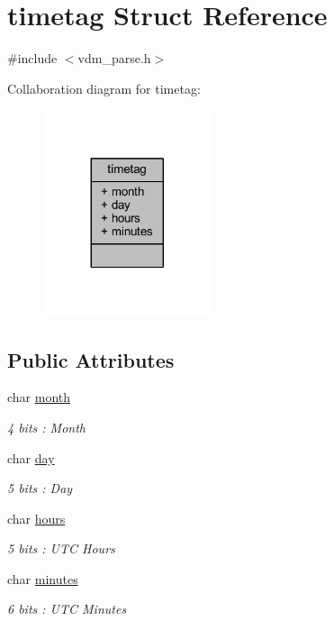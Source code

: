\hypertarget{structtimetag}{}\section{timetag Struct Reference}
\label{structtimetag}


{\ttfamily \#include $<$vdm\+\_\+parse.\+h$>$}



Collaboration diagram for timetag\+:
\nopagebreak
\begin{figure}[H]
\begin{center}
\leavevmode
\includegraphics[width=140pt]{structtimetag__coll__graph}
\end{center}
\end{figure}
\subsection*{Public Attributes}
\begin{DoxyCompactItemize}
\item 
char \mbox{\hyperlink{structtimetag_a9ea92bfa06c5f8c2d1e08e536528d878}{month}}
\begin{DoxyCompactList}\small\item\em 4 bits \+: Month \end{DoxyCompactList}\item 
char \mbox{\hyperlink{structtimetag_aaf31a5094e31ef71840d9da0dcd1dd9e}{day}}
\begin{DoxyCompactList}\small\item\em 5 bits \+: Day \end{DoxyCompactList}\item 
char \mbox{\hyperlink{structtimetag_ae70ed99512e32bd65289ac909edfcf72}{hours}}
\begin{DoxyCompactList}\small\item\em 5 bits \+: U\+TC Hours \end{DoxyCompactList}\item 
char \mbox{\hyperlink{structtimetag_a7fd38c7c38359d0ea51be98e655f5556}{minutes}}
\begin{DoxyCompactList}\small\item\em 6 bits \+: U\+TC Minutes \end{DoxyCompactList}\end{DoxyCompactItemize}



